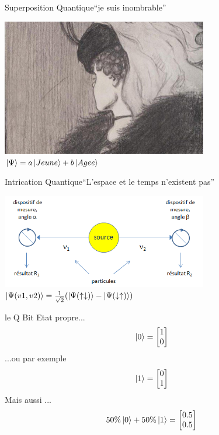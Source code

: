 \documentclass{beamer}
\begin{document}
\begin{frame}{Superposition Quantique}{``je suis inombrable''}
  \begin{center}
    \includegraphics[width=9cm]{3604843-inline.jpg}\\
    \vspace{0.5cm}
    $\ket{\Psi} = a \ket{Jeune} + b \ket{Agee}$ 
  \end{center}
\end{frame}

\begin{frame}{Intrication Quantique}{``L'espace et le temps n'existent pas''}
  \begin{center}
        \includegraphics[width=9cm]{intrication.png}\\
    \vspace{0.5cm}
    $\ket{\Psi(v1, v2)} = \frac{1}{\sqrt{2}}(\ket{\Psi(\uparrow\downarrow)} - \ket{\Psi(\downarrow\uparrow)})$
  \end{center}
\end{frame}

\begin{frame}{le Q Bit}
  Etat propre...
  \begin{equation*}
    \ket{0} =
    \begin{bmatrix}
      1 \\
      0 
    \end{bmatrix}
  \end{equation*}
  ...ou par exemple
  \begin{equation*}
    \ket{1} =
    \begin{bmatrix}
      0 \\
      1 
    \end{bmatrix}
  \end{equation*}
    Mais aussi ...
  \begin{equation*}
    50\%\ket{0} + 50\%\ket{1} =
    \begin{bmatrix}
      0.5 \\
      0.5 
    \end{bmatrix}
  \end{equation*}
\end{frame}
\end{document}
